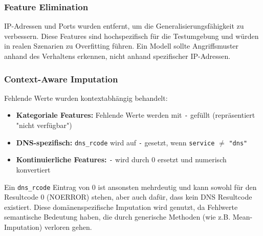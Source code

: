 \documentclass[12pt,oneside]{article}
\begin{document}
	\subsubsection{Feature Elimination}
	IP-Adressen und Ports wurden entfernt, um die Generalisierungsfähigkeit zu verbessern. Diese Features sind hochspezifisch für die Testumgebung und würden in realen Szenarien zu Overfitting führen. Ein Modell sollte Angriffsmuster anhand des Verhaltens erkennen, nicht anhand spezifischer IP-Adressen.
	\subsubsection{Context-Aware Imputation}
	Fehlende Werte wurden kontextabhängig behandelt:
	\begin{itemize}
		\item \textbf{Kategoriale Features:} Fehlende Werte werden mit \texttt{-} gefüllt (repräsentiert "nicht verfügbar")
		\item \textbf{DNS-spezifisch:} \texttt{dns\_rcode} wird auf \texttt{-} gesetzt, wenn \texttt{service} $\neq$ \texttt{"dns"}
		\item \textbf{Kontinuierliche Features:} \texttt{-} wird durch 0 ersetzt und numerisch konvertiert
	\end{itemize}
	Ein \texttt{dns\_rcode} Eintrag von 0 ist ansonsten mehrdeutig und kann sowohl für den Resultcode 0 (NOERROR) stehen, aber auch dafür, dass kein DNS Resultcode existiert. Diese domänenspezifische Imputation wird genutzt, da Fehlwerte semantische Bedeutung haben, die durch generische Methoden (wie z.B. Mean-Imputation) verloren gehen.
\end{document}
